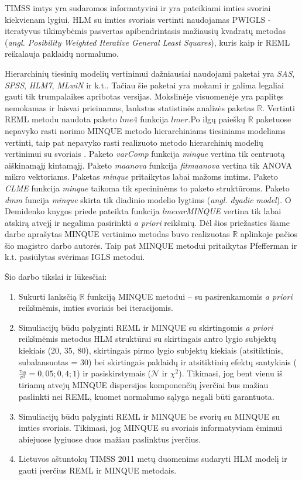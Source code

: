 \documentclass[11pt,a4paper]{article}
\newcommand{\R}{{\mathbb R}}
\begin{document}
\indent TIMSS imtys yra sudaromos informatyviai ir yra pateikiami imties svoriai kiekvienam lygiui\cite{2011Sample}. HLM su imties svoriais vertinti naudojamas PWIGLS - iteratyvus tikimybėmis pasvertas apibendrintasis mažiausių kvadratų metodas (\textit{angl. Posibility Weighted Iterative General Least Squares}), kuris kaip ir REML reikalauja paklaidų normalumo.

\indent Hierarchinių tiesinių modelių vertinimui dažniausiai naudojami paketai yra \textit{SAS}, \textit{SPSS}, \textit{HLM7}, \textit{MLwiN} ir k.t.. Tačiau šie paketai yra mokami ir galima legaliai gauti tik trumpalaikes apribotas versijas. Mokslinėje visuomenėje yra paplitęs nemokamas ir laisvai prieinamas, lankstus statistinės analizės paketas $\R$. Vertinti REML metodu naudota paketo $lme4$ funkcija $lmer$.Po ilgų paieškų $\R$ paketuose nepavyko rasti norimo MINQUE metodo hierarchiniams tiesiniams modeliams vertinti, taip pat nepavyko rasti realizuoto metodo hierarchinių modelių vertinimui su svoriais . Paketo \textit{varComp} funkcija \textit{minque} vertina tik centruotą aiškinamąjį kintamąjį. Paketo \textit{maanova} funkcija \textit{fitmaanova} vertina tik ANOVA mikro vektoriams. Paketas \textit{minque} pritaikytas labai mažoms imtims. Paketo \textit{CLME} funkcija \textit{minque} taikoma tik specininėms to paketo struktūroms. Paketo \textit{dmm} funcija \textit{minque} skirta  tik diadinio modelio lygtims (\textit{angl. dyadic model}). O Demidenko knygos \cite{mixedR} priede pateikta funkcija \textit{lmevarMINQUE} vertina tik labai atskirą atvejį ir negalima pasirinkti \textit{a priori} reikšmių. Dėl šios priežasties šiame darbe aprašytas MINQUE vertinimo metodas buvo realizuotas $\R$ aplinkoje pačios šio magistro darbo autorės. Taip pat MINQUE metodui pritaikytas Pfefferman ir k.t.\cite{pfeff} pasiūlytas svėrimas IGLS metodui.

\indent Šio darbo tikslai ir lūkesčiai:
\begin{enumerate}
\item Sukurti lanksčią $\R$ funkciją MINQUE metodui -- su pasirenkamomis \textit{a priori} reikšmėmis,  imties svoriais bei iteracijomis.
\item Simuliacijų būdu palyginti REML ir MINQUE su skirtingomis \textit{a priori} reikšmėmis metodus HLM struktūrai su skirtingais antro lygio subjektų kiekiais (20, 35, 80), skirtingais pirmo lygio subjektų kiekiais (atsitiktinis, subalansuotas = 30) bei skirtingais paklaidų ir atsitiktinių efektų santykiais ($\frac{\tau_{00}}{\sigma^2}=0,05;0,4;1$) ir pasiskirstymais ($\mathcal{N}$ ir $\chi^2$). Tikimasi, jog bent vienu iš tiriamų atvejų MINQUE dispersijos komponenčių įverčiai bus mažiau paslinkti nei REML, kuomet normalumo sąlyga negali būti garantuota.
\item Simuliacijų būdu palyginti REML ir MINQUE be svorių su MINQUE su imties svoriais. Tikimasi, jog MINQUE su svoriais informatyviam ėmimui abiejuose lygiuose duos mažiau paslinktus įverčius.
\item Lietuvos aštuntokų TIMSS 2011 metų duomenims sudaryti HLM modelį ir gauti įverčius REML ir MINQUE metodais.
\end{enumerate}
\end{document}
